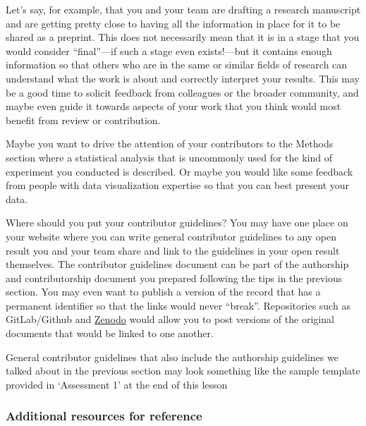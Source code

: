 \documentclass[
  letterpaper,
  DIV=11,
  numbers=noendperiod]{scrreport}
\begin{document}
Let's say, for example, that you and your team are drafting a research
manuscript and are getting pretty close to having all the information in
place for it to be shared as a preprint. This does not necessarily mean
that it is in a stage that you would consider ``final''---if such a
stage even exists!---but it contains enough information so that others
who are in the same or similar fields of research can understand what
the work is about and correctly interpret your results. This may be a
good time to solicit feedback from colleagues or the broader community,
and maybe even guide it towards aspects of your work that you think
would most benefit from review or contribution.

Maybe you want to drive the attention of your contributors to the
Methods section where a statistical analysis that is uncommonly used for
the kind of experiment you conducted is described. Or maybe you would
like some feedback from people with data visualization expertise so that
you can best present your data.

Where should you put your contributor guidelines? You may have one place
on your website where you can write general contributor guidelines to
any open result you and your team share and link to the guidelines in
your open result themselves. The contributor guidelines document can be
part of the authorship and contributorship document you prepared
following the tips in the previous section. You may even want to publish
a version of the record that has a permanent identifier so that the
links would never ``break''. Repositories such as GitLab/Github and
\href{https://zenodo.org/}{Zenodo} would allow you to post versions of
the original documents that would be linked to one another.

General contributor guidelines that also include the authorship
guidelines we talked about in the previous section may look something
like the sample template provided in `Assessment 1' at the end of this
lesson

\hypertarget{additional-resources-for-reference}{%
\subsubsection{Additional resources for
reference}\label{additional-resources-for-reference}}
\end{document}
